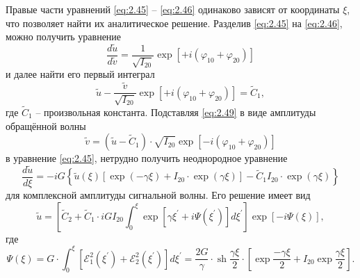 Правые части уравнений \eqref{eq:2.45} -- \eqref{eq:2.46} одинаково зависят от координаты $\xi$,
что позволяет найти их аналитическое решение. Разделив \eqref{eq:2.45} на \eqref{eq:2.46}, можно
получить уравнение
\begin{equation}
	\label{eq:2.48}
	\frac{d \tilde{u}}{d \tilde{v}}=\frac{1}{\sqrt{I_{20}}} \exp \left[+i\left(\varphi_{10}+\varphi_{20}\right)\right]
\end{equation}
и далее найти его первый интеграл
\begin{equation}
	\label{eq:2.49}
	\tilde{u}-\frac{\tilde{v}}{\sqrt{I_{20}}} \exp \left[+i\left(\varphi_{10}+\varphi_{20}\right)\right]=\tilde{C}_{1},
\end{equation}
где $\tilde{C}_{1}$ -- произвольная константа. Подставляя \eqref{eq:2.49} в виде амплитуды обращённой волны
\begin{equation}
	\label{eq:2.50}
	\tilde{v}=\left(\tilde{u}-\tilde{C}_{1}\right) \cdot \sqrt{I_{20}} \exp \left[-i\left(\varphi_{10}+\varphi_{20}\right)\right]
\end{equation}
в уравнение \eqref{eq:2.45}, нетрудно получить неоднородное уравнение
\begin{equation}
	\label{eq:2.51}
	\frac{d \tilde{u}}{d \xi}=-i G\left\{\tilde{u}(\xi)\left[\exp (-\gamma \xi)+I_{20} \cdot \exp (\gamma \xi)\right]-\tilde{C}_{1} I_{20} \cdot \exp (\gamma \xi)\right\}
\end{equation}
для комплексной амплитуды сигнальной волны. Его решение имеет вид
\begin{equation}
	\label{eq:2.52}
	\tilde{u}=\left[\tilde{C}_{2}+\tilde{C}_{1} \cdot i G I_{20} \int_{0}^{\xi} \exp \left[\gamma \xi^{\prime}+i \Psi\left(\xi^{\prime}\right)\right] d \xi^{\prime}\right] \exp [-i \Psi(\xi)],
\end{equation}
где
\begin{equation}
	\label{eq:2.53}
	\Psi(\xi)=G \cdot \int_{0}^{\xi}\left[\mathcal{E}_{1}^{2}\left(\xi^{\prime}\right)+\mathcal{E}_{2}^{2}\left(\xi^{\prime}\right)\right] d \xi^{\prime}=\frac{2 G}{\gamma} \cdot \operatorname{sh} \frac{\gamma \xi}{2} \cdot\left[\exp \frac{-\gamma \xi}{2}+I_{20} \exp \frac{\gamma \xi}{2}\right].
\end{equation}

